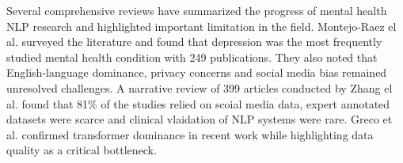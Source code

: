 \documentclass{article}
\begin{document}
Several comprehensive reviews have summarized the progress of mental health NLP  research and highlighted important limitation in the field. Montejo-Raez el al. \cite{montejo2024survey} surveyed the literature and found that depression was the most frequently studied mental health condition with 249 publications. They also noted that English-language dominance, privacy concerns and social media bias remained unresolved challenges. A narrative review of 399 articles conducted by  Zhang el al.\cite{zhang2022natural} found that 81\% of the studies relied on scoial media data, expert annotated datasets were scarce and clinical vlaidation of NLP systems were rare. Greco et al. \cite{greco2023transformer} confirmed transformer dominance in recent work while highlighting data quality as a critical bottleneck.
















\end{document}

